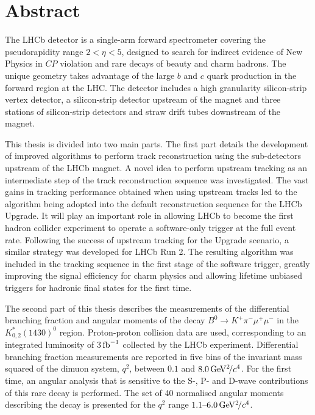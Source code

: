 \section*{Abstract}

The LHCb detector is a single-arm forward spectrometer covering the pseudorapidity range $2 < \eta < 5$, designed to search for indirect evidence of New Physics in $C\!P$ violation and rare decays of beauty and charm hadrons. The unique geometry takes advantage of the large $b$ and $c$ quark production in the forward region at the LHC. The detector includes a high granularity silicon-strip vertex detector, a silicon-strip detector upstream of the magnet and three stations of silicon-strip detectors and straw drift tubes downstream of the magnet.

This thesis is divided into two main parts. The first part details the development of improved algorithms to perform track reconstruction using the sub-detectors upstream of the LHCb magnet. A novel idea to perform upstream tracking as an intermediate step of the track reconstruction sequence was investigated. The vast gains in tracking performance obtained when using upstream tracks led to the algorithm being adopted into the default reconstruction sequence for the LHCb Upgrade. It will play an important role in allowing LHCb to become the first hadron collider experiment to operate a software-only trigger at the full event rate. Following the success of upstream tracking for the Upgrade scenario, a similar strategy was developed for LHCb Run 2. The resulting algorithm was included in the tracking sequence in the first stage of the software trigger, greatly improving the signal efficiency for charm physics and allowing lifetime unbiased triggers for hadronic final states for the first time.

The second part of this thesis describes the measurements of the differential branching fraction and angular moments of the decay $B^{0} \to K^{+}\pi^{-}\mu^{+}\mu^{-}$ in the $K^{*}_{0,2}(1430)^{0}$ region. Proton-proton collision data are used, corresponding to an integrated luminosity of 3$\mbox{\,fb}^{-1}$ collected by the LHCb experiment. Differential branching fraction measurements are reported in five bins of the invariant mass squared of the dimuon system, $q^{2}$, between $0.1$ and $8.0{\mathrm{\,Ge\kern -0.1em V^2\!/}c^4}$. For the first time, an angular analysis that is sensitive to the S-, P- and D-wave contributions of this rare decay is performed. The set of 40 normalised angular moments describing the decay is presented for the $q^{2}$ range $1.1$--$6.0{\mathrm{\,Ge\kern -0.1em V^2\!/}c^4}$. 

